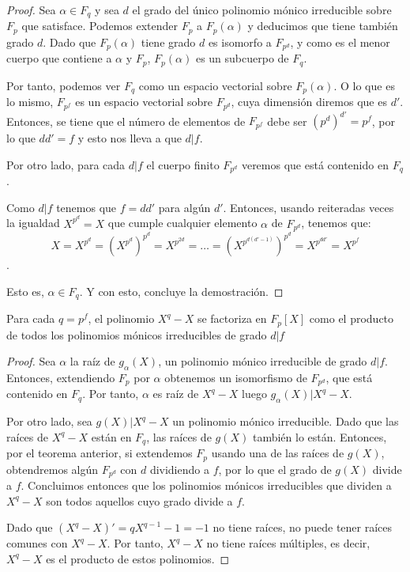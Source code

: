 \begin{proof}
	Sea $\alpha \in F_q$ y sea $d$ el grado del único polinomio mónico irreducible sobre $F_p$ que satisface. Podemos extender $F_p$ a $F_p (\alpha)$ y deducimos que tiene también grado $d$. Dado que $F_p(\alpha)$ tiene grado $d$ es isomorfo a $F_{p^d}$, y como es el menor cuerpo que contiene a $\alpha$ y $F_p$, $F_p(\alpha)$ es un subcuerpo de $F_q$.
	
	Por tanto, podemos ver $F_q$ como un espacio vectorial sobre $F_p(\alpha)$. O lo que es lo mismo, $F_{p^f}$ es un espacio vectorial sobre $F_{p^d}$, cuya dimensión diremos que es $d'$. Entonces, se tiene que el número de elementos de $F_{p^f}$ debe ser $(p^d)^{d'} = p^f$, por lo que $d d' = f$ y esto nos lleva a que $d|f$.
	
	Por otro lado, para cada $d|f$ el cuerpo finito $F_{p^d}$ veremos que está contenido en $F_q$.
	
	Como $d|f$ tenemos que $f=dd'$ para algún $d'$. Entonces, usando reiteradas veces la igualdad $X^{p^d} = X$ que cumple cualquier elemento $\alpha$ de $F_{p^d}$, tenemos que:
	$$X = X^{p^d} = \left(X^{p^d}\right)^{p^d} = X^{p^{2d}} = \dots = \left(X^{p^{d(d'-1)}}\right)^{p^d} = X^{p^{dd'}} = X^{p^f}$$.
	
	Esto es, $\alpha \in F_q$. Y con esto, concluye la demostración.
\end{proof}

\begin{thm}
	Para cada $q = p^f$, el polinomio $X^q - X$ se factoriza en $F_p[X]$ como el producto de todos los polinomios mónicos irreducibles de grado $d|f$
\end{thm}

\begin{proof}
	Sea $\alpha$ la raíz de $g_\alpha(X)$, un polinomio mónico irreducible de grado $d|f$. Entonces, extendiendo $F_p$ por $\alpha$ obtenemos un isomorfismo de $F_{p^d}$, que está contenido en $F_q$. Por tanto, $\alpha$ es raíz de $X^q - X$ luego $g_\alpha(X) | X^q - X$.
	
	Por otro lado, sea $g(X) | X^q - X$ un polinomio mónico irreducible. Dado que las raíces de $X^q - X$ están en $F_q$, las raíces de $g(X)$ también lo están. Entonces, por el teorema anterior, si extendemos $F_p$ usando una de las raíces de $g(X)$, obtendremos algún $F_{p^d}$ con $d$ dividiendo a $f$, por lo que el grado de $g(X)$ divide a $f$. Concluimos entonces que los polinomios mónicos irreducibles que dividen a $X^q - X$ son todos aquellos cuyo grado divide a $f$.
	
	Dado que $\left(X^q - X\right)' = qX^{q-1} - 1 = -1$ no tiene raíces, no puede tener raíces comunes con $X^q - X$. Por tanto, $X^q - X$ no tiene raíces múltiples, es decir, $X^q - X$ es el producto de estos polinomios.
\end{proof}

